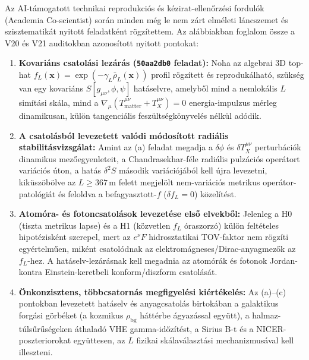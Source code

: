 \documentclass[10pt,a4paper]{article}
\begin{document}
{\small\setlength{\parskip}{1.6pt}
\vspace{-2mm}\par\vspace{0.5pt}
Az AI-t\'amogatott technikai reprodukci\'os \'es k\'ezirat-ellen\H{o}rz\'esi fordul\'ok (Academia Co-scientist) sor\'an minden m\'eg le nem z\'art elm\'eleti l\'ancszemet \'es szisztematik\'at nyitott feladatk\'ent r\"ogz\'itettem. Az al\'abbiakban foglalom \"ossze a V20 \'es V21 auditokban azonos\'itott nyitott pontokat:

\begin{enumerate}\setlength{\itemsep}{1.5pt}\setlength{\parskip}{0pt}\setlength{\topsep}{1pt}
  \item[\textbf{(a)}] \textbf{Kovari\'ans csatol\'asi lez\'ar\'as (\texttt{50aa2db0} feladat):} Noha az algebrai 3D top-hat $f_L(\mathbf{x}) = \exp(-\gamma_L\bar{\rho}_L(\mathbf{x}))$ profil r\"ogz\'itett \'es reproduk\'alhat\'o, sz\"uks\'eg van egy kovari\'ans $S[g_{\mu\nu},\phi,\psi]$ hat\'aselvre, amelyb\H{o}l mind a nemlok\'alis $L$ sim\'it\'asi sk\'ala, mind a $\nabla_\mu(T^{\mu\nu}_{\text{matter}} + T^{\mu\nu}_X) = 0$ energia-impulzus m\'erleg dinamikusan, k\"ul\"on tangenci\'alis fesz\"ults\'egk\"onyvel\'es n\'elk\"ul ad\'odik.
  \item[\textbf{(b)}] \textbf{A csatol\'asb\'ol levezetett val\'odi m\'odos\'itott radi\'alis stabilit\'asvizsg\'alat:} Amint az (a) feladat megadja a $\delta\phi$ \'es $\delta T^{\mu\nu}_X$ perturb\'aci\'ok dinamikus mez\H{o}egyenleteit, a Chandrasekhar-f\'ele radi\'alis pulz\'aci\'os oper\'atort vari\'aci\'os \'uton, a hat\'as $\delta^2 S$ m\'asodik vari\'aci\'oj\'ab\'ol kell \'ujra levezetni, kik\"usz\"ob\"olve az $L \ge 367\,\text{m}$ felett megjel\"olt nem-vari\'aci\'os metrikus oper\'ator-patol\'ogi\'at \'es feloldva a befagyasztott-$f$ ($\delta f_L = 0$) k\"ozel\'it\'est.
  \item[\textbf{(c)}] \textbf{Atom\'ora- \'es fotoncsatol\'asok levezet\'ese els\H{o} elvekb\H{o}l:} Jelenleg a H0 (tiszta metrikus lapse) \'es a H1 (k\"ozvetlen $f_L$ \'oraszorz\'o) k\"ul\"on felt\'eteles hipot\'ezisk\'ent szerepel, mert az $e^\nu F$ hidrosztatikai TOV-faktor nem r\"ogz\'iti egy\'ertelm\H{u}en, mik\'ent csatol\'odnak az elektrom\'agneses/Dirac-anyagmez\H{o}k az $f_L$-hez. A hat\'aselv-lez\'ar\'asnak kell megadnia az atom\'or\'ak \'es fotonok Jordan- kontra Einstein-keretbeli konform/diszform csatol\'as\'at.
  \item[\textbf{(d)}] \textbf{\"Onkonzisztens, t\"obbcsatorn\'as megfigyel\'esi ki\'ert\'ekel\'es:} Az (a)--(c) pontokban levezetett hat\'aselv \'es anyagcsatol\'as birtok\'aban a galaktikus forg\'asi g\"orb\'eket (a kozmikus $\rho_{\text{bg}}$ h\'att\'erbe \'agyaz\'assal egy\"utt), a halmaz-t\'uls\H{u}r\H{u}s\'egeken \'athalad\'o VHE gamma-id\H{o}z\'it\'est, a Sirius B-t \'es a NICER-poszteriorokat egy\"uttesen, az $L$ fizikai sk\'alav\'alaszt\'asi mechanizmus\'aval kell illeszteni.
\end{enumerate}

}
\end{document}
